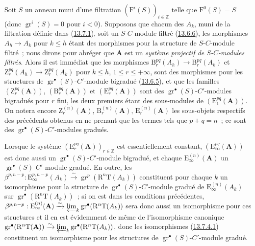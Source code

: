 \begin{env}[13.7.6]
\label{0.13.7.6-fr}
Soit $S$ un anneau muni d'une filtration
$(\mathrm F^i(S))_{i\in\mathbb Z}$ telle que $\mathrm F^0(S)=S$ (donc
$\operatorname{gr}^i(S)=0$ pour $i<0$). Supposons que chacun des $A_k$,
muni de la filtration définie dans
(\hyperref[0.13.7.1-fr]{13.7.1}), soit un $S$-$C$-module filtré
(\hyperref[0.13.6.6-fr]{13.6.6}), les morphismes $A_h\to A_k$ pour
$k\leq h$ étant des morphismes pour la structure de $S$-$C$-module
filtré~; nous dirons pour abréger que $\mathbf A$ est un \emph{système
projectif de $S$-$C$-modules filtrés}. Alors il est immédiat que les
morphismes $\mathrm B_r^{pq}(A_h)\to\mathrm B_r^{pq}(A_k)$ et
$\mathrm Z_r^{pq}(A_h)\to\mathrm Z_r^{pq}(A_k)$ pour $k\leq h$,
$1\leq r\leq+\infty$, sont des morphismes pour les structures de
$\operatorname{gr}^\bullet(S)$-$C'$-module bigradué
(\hyperref[0.13.6.5-fr]{13.6.5}), et que les familles
$(\mathrm Z_r^{pq}(\mathbf A))$, $(\mathrm B_r^{pq}(\mathbf A))$ et
$(\mathrm E_r^{pq}(\mathbf A))$ sont des
$\operatorname{gr}^\bullet(S)$-$C'$-modules bigradués pour $r$ fini,
les deux premiers étant des sous-modules de
$(\mathrm E_1^{pq}(\mathbf A))$. On notera encore
$\mathrm Z_r^{(n)}(\mathbf A)$, $\mathrm B_r^{(n)}(\mathbf A)$,
$\mathrm E_r^{(n)}(\mathbf A)$ les sous-objets respectifs des précédents
obtenus en ne prenant que les termes tels que $p+q=n$~; ce sont des
$\operatorname{gr}^\bullet(S)$-$C'$-modules gradués.

Lorsque le système $(\mathrm E_r^{pq}(\mathbf A))_{r\in\mathbb Z}$ est
essentiellement constant, $(\mathrm E_\infty^{pq}(\mathbf A))$ est donc
aussi un $\operatorname{gr}^\bullet(S)$-$C'$-module bigradué, et chaque
$\mathrm E_\infty^{(n)}(\mathbf A)$ un
$\operatorname{gr}^\bullet(S)$-$C'$-module gradué. En outre, les
$\beta^{p,n-p}:\mathrm E_\infty^{p,n-p}(A_k)\xrightarrow{\sim}
\operatorname{gr}^p(\mathrm R^n\mathrm T(A_k))$ constituent pour chaque
$k$ un isomorphisme pour la structure de
$\operatorname{gr}^\bullet(S)$-$C'$-module gradué de
$\mathrm E_\infty^{(n)}(A_k)$ sur
$\operatorname{gr}^\bullet(\mathrm R^n\mathrm T(A_k))$~; si on est dans
les conditions précédentes,
$\beta^{p,n-p}:\mathrm E_\infty^{(n)}(\mathbf A)\xrightarrow{\sim}
\varprojlim_k\operatorname{gr}^\bullet(\mathrm R^n\mathrm T(A_k))$
sera donc aussi un isomorphisme pour ces structures et il en est
évidemment de même de l'isomorphisme canonique
$\operatorname{gr}^\bullet(\mathrm R^n\mathrm T(\mathbf A))
\xrightarrow{\sim}
\varprojlim_k\operatorname{gr}^\bullet(\mathrm R^n\mathrm T(A_k))$,
donc les isomorphismes
(\hyperref[0.13.7.4.1-fr]{13.7.4.1}) constituent un isomorphisme pour les
structures de $\operatorname{gr}^\bullet(S)$-$C'$-module gradué.
\end{env}

